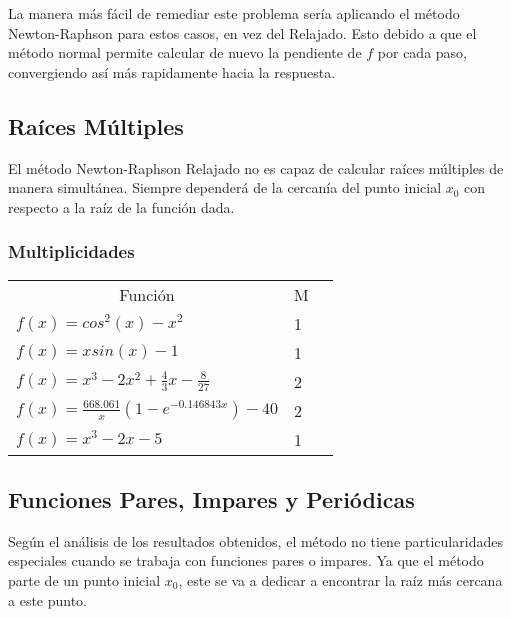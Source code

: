 \documentclass[a4paper,12pt]{article}
\begin{document}
La manera más fácil de remediar este problema sería aplicando el método Newton-Raphson para estos casos, en vez del Relajado. Esto debido a que el método normal permite calcular de nuevo la pendiente de $f$ por cada paso, convergiendo así más rapidamente hacia la respuesta. \par

\subsection{Raíces Múltiples}

El método Newton-Raphson Relajado no es capaz de calcular raíces múltiples de manera simultánea. Siempre dependerá de la cercanía del punto inicial $x_0$ con respecto a la raíz de la función dada. \par

\subsubsection{Multiplicidades}

\begin{table}[ht!]
\begin{tabular}{llr}
\multicolumn{1}{c}{Función}  & 
\multicolumn{1}{c}{M} 
\\
$f(x) = cos^2(x)-x^2$              & 1                        
\\
$f(x) = xsin(x)-1$                 & 1                 
\\
$f(x) = x^3-2x^2+\frac{4}{3}x-\frac{8}{27}$   & 2 
\\
$f(x) = \frac{668.061}{x} (1 - e^{-0.146843 x}) - 40$ & 2
\\
$f(x) = x^3-2x-5$             & 1                         
\end{tabular}
\end{table}

\vspace{-1em}

\subsection{Funciones Pares, Impares y Periódicas}

Según el análisis de los resultados obtenidos, el método no tiene particularidades especiales cuando se trabaja con funciones pares o impares. Ya que el método parte de un punto inicial $x_0$, este se va a dedicar a encontrar la raíz más cercana a este punto. \par
\end{document}
